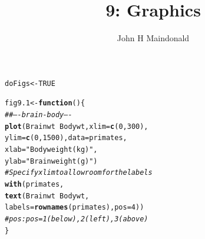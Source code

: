 \documentclass[12pt, a4paper,  BCOR=8.25mm, DIV=15]{scrartcl}\usepackage[]{graphicx}\usepackage[]{color}
\makeatletter
\newcommand{\hlnum}[1]{\textcolor[rgb]{0.686,0.059,0.569}{#1}}%
\newcommand{\hlstr}[1]{\textcolor[rgb]{0.192,0.494,0.8}{#1}}%
\newcommand{\hlcom}[1]{\textcolor[rgb]{0.678,0.584,0.686}{\textit{#1}}}%
\newcommand{\hlopt}[1]{\textcolor[rgb]{0,0,0}{#1}}%
\newcommand{\hlstd}[1]{\textcolor[rgb]{0.345,0.345,0.345}{#1}}%
\newcommand{\hlkwa}[1]{\textcolor[rgb]{0.161,0.373,0.58}{\textbf{#1}}}%
\newcommand{\hlkwb}[1]{\textcolor[rgb]{0.69,0.353,0.396}{#1}}%
\newcommand{\hlkwc}[1]{\textcolor[rgb]{0.333,0.667,0.333}{#1}}%
\newcommand{\hlkwd}[1]{\textcolor[rgb]{0.737,0.353,0.396}{\textbf{#1}}}%
\newenvironment{kframe}{%
 \def\at@end@of@kframe{}%
 \ifinner\ifhmode%
  \def\at@end@of@kframe{\end{minipage}}%
  \begin{minipage}{\columnwidth}%
 \fi\fi%
 \def\FrameCommand##1{\hskip\@totalleftmargin \hskip-\fboxsep
 \colorbox{shadecolor}{##1}\hskip-\fboxsep
     \hskip-\linewidth \hskip-\@totalleftmargin \hskip\columnwidth}%
 \MakeFramed {\advance\hsize-\width
   \@totalleftmargin\z@ \linewidth\hsize
   \@setminipage}}%
 {\par\unskip\endMakeFramed%
 \at@end@of@kframe}
\newenvironment{knitrout}{}{} %
\makeatother
\begin{document}



\title{9: Graphics}
\author{John H Maindonald}
\maketitle

\vspace*{-1cm}

\begin{knitrout}
\color{fgcolor}\begin{kframe}
\begin{alltt}
\hlstd{doFigs} \hlkwb{<-} \hlnum{TRUE}
\end{alltt}
\end{kframe}
\end{knitrout}

\begin{knitrout}
\color{fgcolor}\begin{kframe}
\begin{alltt}
\hlstd{fig9.1} \hlkwb{<-} \hlkwa{function}\hlstd{()\{}
\hlcom{## ---- brain-body ----}
\hlkwd{plot}\hlstd{(Brainwt} \hlopt{~} \hlstd{Bodywt,} \hlkwc{xlim}\hlstd{=}\hlkwd{c}\hlstd{(}\hlnum{0}\hlstd{,} \hlnum{300}\hlstd{),}
     \hlkwc{ylim}\hlstd{=}\hlkwd{c}\hlstd{(}\hlnum{0}\hlstd{,}\hlnum{1500}\hlstd{),} \hlkwc{data}\hlstd{=primates,}
     \hlkwc{xlab}\hlstd{=}\hlstr{"Body weight (kg)"}\hlstd{,}
     \hlkwc{ylab}\hlstd{=}\hlstr{"Brain weight (g)"}\hlstd{)}
\hlcom{# Specify xlim to allow room for the labels}
\hlkwd{with}\hlstd{(primates,}
     \hlkwd{text}\hlstd{(Brainwt} \hlopt{~} \hlstd{Bodywt,}
          \hlkwc{labels}\hlstd{=}\hlkwd{rownames}\hlstd{(primates),} \hlkwc{pos}\hlstd{=}\hlnum{4}\hlstd{))}
\hlcom{# pos: pos=1 (below), 2 (left), 3 (above)}
\hlstd{\}}
\end{alltt}
\end{kframe}
\end{knitrout}
\end{document}
